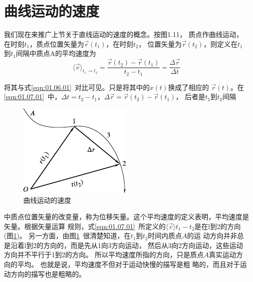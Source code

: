\section{曲线运动的速度}\label{sec:01.07}

我们现在来推广上节关于直线运动的速度的概念。按图1.11，
质点作曲线运动，在时刻$t_1$，质点位置矢量为$\vec{r}\left(t_1\right)$，在时刻$t_2$，
位置矢量为$\vec{r}\left(t_2\right)$，则定义在$t_1$到$t_1$间隔中质点A的平均速度为
\begin{equation}\label{eqn:01.07.01}
  \langle \vec{v} \rangle_{t_1\rightarrow t_2}=\frac{\vec{r}\left(t_2\right)-\vec{r}\left(t_1\right)}{t_2-t_1}=\frac{\Delta \vec{r}}{\Delta t}
\end{equation}

\clearpage\noindent 将其与式\eqref{eqn:01.06.01}~对比可见。只是将其中的$x\left(t\right)$换成了相应的
$\vec{r}\left(t\right)$。在\eqref{eqn:01.07.01}~中，$\Delta t=t_2-t_1$，$\Delta \vec{r}=\vec{r}\left(t_2\right)-\vec{r}\left(t_1\right)$，
后者是$t_1$到$t_2$间隔
\begin{figure}
  \centering
  \small
  \includegraphics{figure/fig01.11}
  \caption{曲线运动的速度}
  \label{fig:01.11}
\end{figure}
中质点位置矢量的改变量，称为位移矢量。这个平均速度的定义表明，平均速度是矢量。根据矢量运算
规则，式\eqref{eqn:01.07.01}~所定义的$\langle \vec{v}\rangle t_1-t_2$是在l到2的方向(图\ref{fig:01.11})。
另一方面，由图\ref{fig:01.11}~很清楚知道，在$t_1$到$t_2$时间内质点$A$的运
动方向并非总是沿着l到2的方向的，而是先从1向3方向运动，
然后从3向2方向运动，这些运动方向并不平行于1到2的方向。
所以平均速度所指的方向，只是质点$A$真实运动方向的平均。
也就是说，平均速度不但对于运动快慢的描写是粗
略的，而且对于运动方向的描写也是粗略的。

